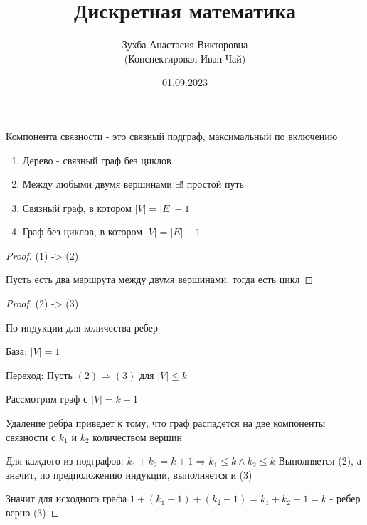 \documentclass[a6paper, 10pt]{article}
\theoremstyle{plain}
\newcommand{\rarrow}{\Rightarrow}
\begin{document}
	\author{Зухба Анастасия Викторовна\\(Конспектировал Иван-Чай)}
	\date{01.09.2023}
	\title{Дискретная математика}

	\linespread{1.4}
	\selectfont

	\maketitle
	\newpage

	\begin{defintion}
	Компонента связности - это связный подграф, максимальный по включению
	\end{defintion}

	\begin{definition}
		\begin{enumerate}
			\item Дерево - связный граф без циклов
			\item Между любыми двумя вершинами $ \exists! $ простой путь
			\item  Связный граф, в котором $ \left| V \right| = \left| E \right| - 1 $
			\item Граф без циклов, в котором $ \left| V \right| = \left| E \right| - 1 $
		\end{enumerate}
	\end{definition}

	\begin{proof}
		(1) -> (2)

		Пусть есть два маршрута между двумя вершинами, тогда есть цикл
	\end{proof}

	\begin{proof}
		(2) -> (3)

		По индукции для количества ребер

		База: $ \left| V \right| = 1 $

		Переход: Пусть $(2) \rarrow (3) $ для $ \left| V \right| \leq k $

		Рассмотрим граф с $ \left| V \right| = k + 1 $

		Удаление ребра приведет к тому, что граф распадется на две компоненты связности
		с $ k_1 $ и $ k_2 $ количеством вершин

		Для каждого из подграфов: $ k_1 + k_2 = k + 1 \rarrow k_1 \leq k \land k_2 \leq k $
		Выполняется (2), а значит, по предположению индукции, выполняется и (3)

		Значит для исходного графа $ 1 + (k_1 - 1) + (k_2 - 1) = k_1 + k_2 - 1 = k $ - ребер
		верно (3)
	\end{proof}
\end{document}
